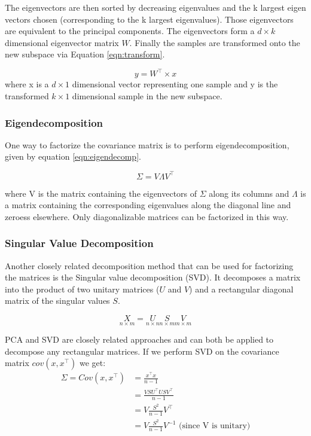 The eigenvectors are then sorted by decreasing eigenvalues and the k largest eigen vectors chosen (corresponding to the k largest eigenvalues). Those eigenvectors are equivalent to the principal components. The eigenvectors form a $d \times k$ dimensional eigenvector matrix $W$. Finally the samples are transformed onto the new subspace via Equation \ref{eqn:transform}.

\begin{equation}
\label{eqn:transform}
y = W^\intercal \times x
\end{equation}
where x is a $d\times1$ dimensional vector representing one sample and y is the transformed $k\times1$ dimensional sample in the new subspace.

\subsubsection{Eigendecomposition}
One way to factorize the covariance matrix is to perform eigendecomposition, given by equation \ref{eqn:eigendecomp}.

\begin{equation}
    \label{eqn:eigendecomp}
    \Sigma = V \Lambda V^\intercal
\end{equation}

where V is the matrix containing the eigenvectors of $\Sigma$ along its columns and $\Lambda$ is a matrix containing the corresponding eigenvalues along the diagonal line and zeroess elsewhere. Only diagonalizable matrices can be factorized in this way.

\subsubsection{Singular Value Decomposition} %
Another closely related decomposition method that can be used for factorizing the matrices is the Singular value decomposition (SVD). It decomposes a matrix into the product of two unitary matrices ($U$ and $V$) and a rectangular diagonal matrix of the singular values $S$.

\begin{equation}
    \label{eqn:SVD}
    \underset{n\times m}{X} = \underset{n \times n}{U} \underset{n \times m}{S} \underset{m \times m}{V}
\end{equation}


PCA and SVD are closely related approaches and can both be applied to decompose any rectangular matrices. If we perform SVD on the covariance matrix $cov(x,x^\intercal)$ we get:
\begin{align*}
    \Sigma = Cov(x,x^\intercal) &= \frac{x^\intercal x}{n-1} \\
    &= \frac{VS U^\intercal U S V^\intercal}{n-1} \\
    &= V \frac{S^2}{n-1} V^\intercal \\
    &= V \frac{S^2}{n-1}V^{-1} \text{ (since V is unitary)} \\
\end{align*}

